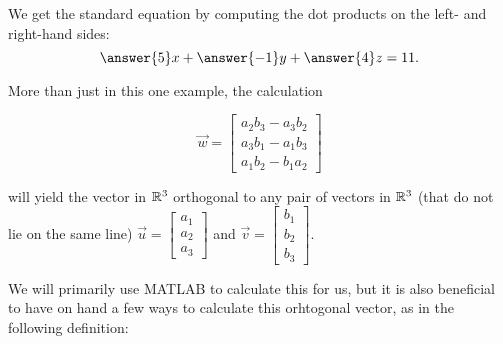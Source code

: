 \documentclass{ximera}
\begin{document}
\begin{solution}
    We get the standard equation by computing the dot products on the
    left- and right-hand sides:
    \begin{equation*}
      \answer{5}x +\answer{-1} y + \answer{4}z = 11.
    \end{equation*}

  \end{solution}

  More than just in this one example, the calculation 

  
  $$\vec{w}=\begin{bmatrix}
      a_2b_3-a_3b_2\\a_3b_1-a_1b_3\\a_1b_2-b_1a_2
    \end{bmatrix}$$

  will yield the vector in $\mathbb{R}^3$ orthogonal to any pair of vectors in $\mathbb{R}^3$ (that do not lie on the same line) $\vec{u}=\begin{bmatrix}
      a_1\\a_2\\a_3
    \end{bmatrix}$ and $\vec{v}=\begin{bmatrix}
      b_1\\b_2\\b_3
    \end{bmatrix}$.

   

  We will primarily use MATLAB to calculate this for us, but it is also beneficial to have on hand a few ways to calculate this orhtogonal vector, as in the following definition:
 
\end{document}
